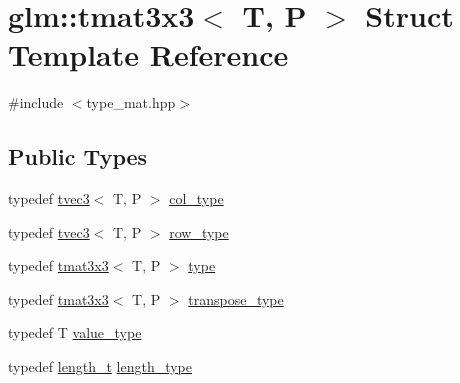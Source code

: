\hypertarget{structglm_1_1tmat3x3}{}\section{glm\+::tmat3x3$<$ T, P $>$ Struct Template Reference}
\label{structglm_1_1tmat3x3}


{\ttfamily \#include $<$type\+\_\+mat.\+hpp$>$}

\subsection*{Public Types}
\begin{DoxyCompactItemize}
\item 
typedef \mbox{\hyperlink{structglm_1_1tvec3}{tvec3}}$<$ T, P $>$ \mbox{\hyperlink{structglm_1_1tmat3x3_a0b80bddb3cb4e01aa04d1c7a5a47365a}{col\+\_\+type}}
\item 
typedef \mbox{\hyperlink{structglm_1_1tvec3}{tvec3}}$<$ T, P $>$ \mbox{\hyperlink{structglm_1_1tmat3x3_a98418fd5ee5f7d505a08b913086d8d25}{row\+\_\+type}}
\item 
typedef \mbox{\hyperlink{structglm_1_1tmat3x3}{tmat3x3}}$<$ T, P $>$ \mbox{\hyperlink{structglm_1_1tmat3x3_a0c427c28a6ca62343de768023cd69bf4}{type}}
\item 
typedef \mbox{\hyperlink{structglm_1_1tmat3x3}{tmat3x3}}$<$ T, P $>$ \mbox{\hyperlink{structglm_1_1tmat3x3_ac27e769fb5ed861068079f433a1d5b8f}{transpose\+\_\+type}}
\item 
typedef T \mbox{\hyperlink{structglm_1_1tmat3x3_a90013767ff8a88d1ec5dd54574579669}{value\+\_\+type}}
\item 
typedef \mbox{\hyperlink{namespaceglm_a090a0de2260835bee80e71a702492ed9}{length\+\_\+t}} \mbox{\hyperlink{structglm_1_1tmat3x3_a78fa6e6e406213fa0049b5125b2686b5}{length\+\_\+type}}
\end{DoxyCompactItemize}
